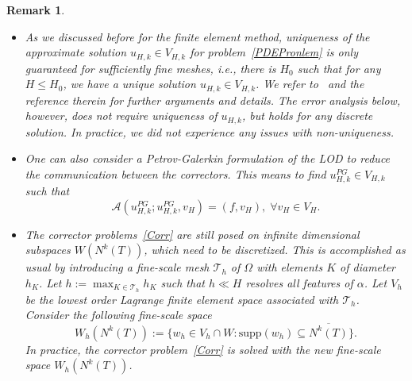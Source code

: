 \documentclass{article}
\newtheorem{remark}[theorem]{Remark}
\begin{document}
\begin{remark}\label{RemarkLod} {\hspace{1cm}}
\begin{itemize}
    \item As we discussed before for the finite element method, uniqueness of the approximate solution $u_{H,k} \in V_{H,k}$ for problem~\eqref{PDEPronlem} is only guaranteed for sufficiently fine meshes, i.e., there is $H_0$ such that for any $H\leq H_0$, we have a unique solution $u_{H,k} \in V_{H,k}$. We refer to~\cite{uniqandnotunique, DouglasGalerkin, FEMQuad} and the reference therein for further arguments and details. The error analysis below, however, does not require uniqueness of $u_{H,k}$, but holds for any discrete solution. In practice, we did not experience any issues with non-uniqueness.
    \item One can also consider a Petrov-Galerkin formulation of the LOD to reduce the communication between the correctors. This means to find $u^{PG}_{H,k} \in V_{H,k}$ such that \[\mathcal{A}(u^{PG}_{H,k} ;u^{PG}_{H,k} ,v_{H})=(f,v_{H}),  \; \forall v_{H} \in V_{H}.\] 
    \item  The corrector problems~\eqref{Corr} are still posed on infinite dimensional subspaces $W(N^{k}(T))$, which need to be discretized. This is accomplished as usual by introducing a fine-scale mesh $\mathcal{T}_h$ of $\Omega$ with elements $K$ of diameter $h_K$. Let $h:=\max_{K \in \mathcal{T}_h}{h_K}$ such that $h\ll H$ resolves all features of $\alpha$. Let $V_h$ be the lowest order Lagrange finite element space associated with $\mathcal{T}_h$. Consider the following fine-scale space\[W_h(N^k(T)):= \{ w_h \in V_h\cap W : \text{supp}(w_h) \subseteq \overline{N^k(T)}\}.\]
    In practice, the corrector problem~\eqref{Corr} is solved with the new fine-scale space $W_h(N^k(T))$.
 
 
\end{itemize}
   

\end{remark} 
\end{document}
